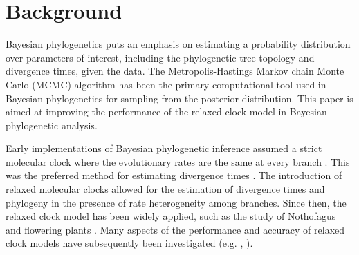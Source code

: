 \documentclass{bmcart}
\begin{document}
\begin{frontmatter}
\begin{abstractbox}
\begin{keyword}
\end{keyword}


\end{abstractbox}
%
\end{frontmatter}


\section*{Background}
Bayesian phylogenetics puts an emphasis on estimating a probability distribution over parameters of interest, including the phylogenetic tree topology and divergence times, given the data. The Metropolis-Hastings Markov chain Monte Carlo (MCMC) \cite{metropolis1953equation,hastings1970monte} algorithm has been the primary computational tool used in Bayesian phylogenetics for sampling from the posterior distribution. This paper is aimed at improving the performance of the relaxed clock model in Bayesian phylogenetic analysis.

Early implementations of Bayesian phylogenetic inference assumed a strict molecular clock where the evolutionary rates are the same at every branch \cite{zuckerkandl1965evolutionary}. This was the preferred method for estimating divergence times \cite{yang1997bayesian,rannala2003bayes}. The introduction of relaxed molecular clocks allowed for the estimation of divergence times \cite{thorne1998estimating} and phylogeny \cite{drummond2006relaxed} in the presence of rate heterogeneity among branches. Since then, the relaxed clock model has been widely applied, such as the study of Nothofagus \cite{knapp2005relaxed} and flowering plants \cite{smith2010uncorrelated}. 
Many aspects of the performance and accuracy of relaxed clock models have subsequently been investigated (e.g. \cite{ho2005accuracy}, \cite{lepage2007general}).
\end{document}
